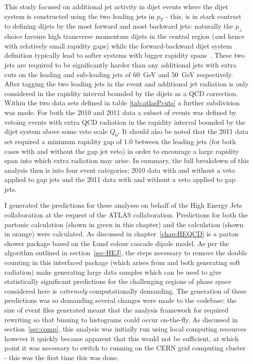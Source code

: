 	This study focused on additional jet activity in dijet events where the dijet system
	is constructed using the two leading jets in $p_T$ - this, is in stark contrast to
	defining dijets by the most forward and most backward jets: naturally the $p_\perp$
	choice favours high transverse momentum dijets in the central region (and hence with
	relatively small rapidity gaps) while the forward-backward dijet system definition
	typically lead to softer systems with bigger rapidity spans~\cite{Abazov:2013gpa}.
	These two jets are required
	to be significantly harder than any additional jets with extra cuts on the leading
	and sub-leading jets of $60$~GeV and $50$~GeV respectively.  After tagging the two
	leading jets in the event and additional jet radiation is only considered in the rapidity
	interval bounded by the dijets as a QCD correction.  Within the two data sets
	defined in table \eqref{tab:atlasPcuts} a further subdivision was made.  For both the
	2010 and 2011 data a subset of events was defined by vetoing events with extra
	QCD radiation in the rapidity interval bounded by the dijet system above some veto
	scale $Q_0$.  It should also be noted that the 2011 data set required a minimum
	rapidity gap of 1.0 between the leading jets (for both cases with and without the gap jet
	veto) in order to encourage a large rapidity span into which extra radiation may arise.
	In summary, the full breakdown of this analysis then is into four event categories;
	2010 data with and without a veto applied to gap jets and the 2011 data with and
	without a veto applied to gap jets.

	I generated the predictions for these analyses on behalf of the High Energy Jets
	collaboration at the request of the ATLAS collaboration. Predictions for both
	the partonic \HEJ calculation (shown in green in this chapter) and the \HEJA
	calculation (shown in orange) were calculated. As discussed in chapter~\ref{chap:HEQCD} \ARIADNE is a parton shower package
	based on the Lund colour cascade dipole model. As per the algorithm outlined in section~\ref{sec:HEJ}, the steps necessary to remove the
	double counting in this interfaced package (which arises from \HEJ and \ARIADNE both
	generating soft radiation) make generating large data samples which can be used to give
	statistically significant predictions for the challenging regions of phase space considered
	here is \emph{extremely} computationally demanding.  The generation of these
	predictions was so demanding several changes were made to the \HEJ codebase; the
	size of event files generated meant that the analysis framework for \hej required
	rewriting so that binning to histograms could occur on-the-fly.  As discussed in section~\ref{sec:comp}, this analysis was
	initially run using local computing resources however it quickly became apparent
	that this would not be sufficient, at which point it was necessary to switch to
	running \HEJ on the CERN grid computing cluster - this was the first time this was done.

